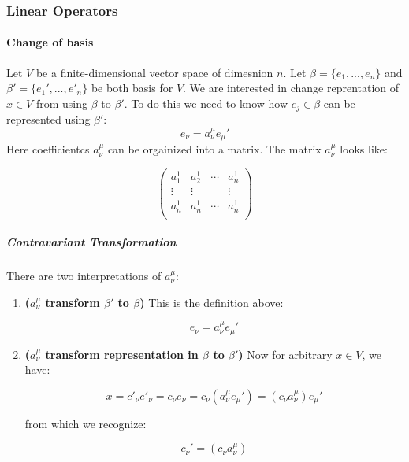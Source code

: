 \subsubsection{Linear Operators}

\paragraph{Change of basis}

Let $V$ be a finite-dimensional vector space of dimesnion $n$. Let $\beta=\{e_1,...,e_n\}$ and $\beta'=\{e_1',...,e'_n\}$ be both basis for $V$. We are interested in change reprentation of $x\in V$ from using $\beta$ to $\beta'$. To do this we need to know how $e_j\in \beta$ can be represented using $\beta'$:
\begin{equation}
e_\nu = a_{\nu}^{\mu} e_{\mu}'
\end{equation}
Here coefficientcs $a_{\nu}^{\mu}$ can be orgainized into a matrix. The matrix $a_{\nu}^{\mu}$ looks like:

\begin{equation}
\begin{pmatrix}
a_1^1 & a_2^1 & \cdots & a_n^1\\
\vdots &\vdots  & &\vdots\\
a_n^1 & a_n^1 & \cdots & a_n^1\\
\end{pmatrix}
\end{equation}

\subparagraph{Contravariant Transformation}

There are two interpretations of $a_{\nu}^{\mu}$:

\begin{enumerate}
\item \textbf{($a_{\nu}^{\mu}$ transform $\beta'$ to $\beta$)} This is the definition above:

\begin{equation}
e_\nu = a_{\nu}^{\mu} e_{\mu}'
\end{equation}


\item \textbf{($a_{\nu}^{\mu}$ transform representation in $\beta$ to $\beta'$)}
Now for arbitrary $x\in V$, we have:

\begin{equation}
x=c'_{\nu}e'_{\nu}=c_{\nu}e_{\nu} =c_\nu (a_{\nu}^{\mu} e_{\mu}' )=(c_\nu a_{\nu}^{\mu}) e_{\mu}'
\end{equation}


from which we recognize:

\begin{equation}
c_{\nu}'=(c_{\nu}a_{\nu}^{\mu})
\end{equation}
\end{enumerate}

